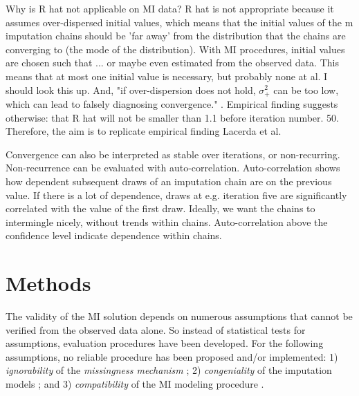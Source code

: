 \documentclass[article]{jss}
\begin{document}
Why is R hat not applicable on MI data? R hat is not appropriate because it assumes over-dispersed initial values, which means that the initial values of the m imputation chains should be 'far away' from the distribution that the chains are converging to (the mode of the distribution). With MI procedures, initial values are chosen such that ... or maybe even estimated from the observed data. This means that at most one initial value is necessary, but probably none at al. I should look this up. And, "if over-dispersion does not hold, $\sigma_+^2$ can be too low, which can lead to falsely diagnosing convergence." \cite[p~437]{broo98}. Empirical finding suggests otherwise: that R hat will not be smaller than 1.1 before iteration number. 50. Therefore, the aim is to replicate empirical finding Lacerda et al. 

Convergence can also be interpreted as stable over iterations, or non-recurring. Non-recurrence can be evaluated with auto-correlation. Auto-correlation shows how dependent subsequent draws of an imputation chain are on the previous value. If there is a lot of dependence, draws at e.g. iteration five are significantly correlated with the value of the first draw. Ideally, we want the chains to intermingle nicely, without trends within chains. Auto-correlation above the confidence level indicate dependence within chains.

% 
% 
% 
% 




\section{Methods} \label{sec:methods}

The validity of the MI solution depends on numerous assumptions that cannot be verified from the observed data alone. So instead of statistical tests for assumptions, evaluation procedures have been developed. For the following assumptions, no reliable procedure has been proposed and/or implemented: 1) \emph{ignorability} of the \emph{missingness mechanism} \citep{rubin87}; 2) \emph{congeniality} of the imputation models \citep{meng94}; and 3) \emph{compatibility} of the MI modeling procedure \citep{rubin96}. 
\end{document}
